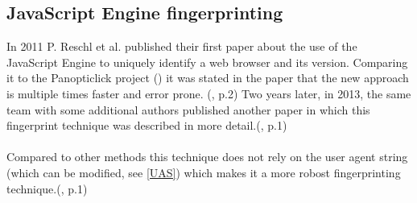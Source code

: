 \subsection{JavaScript Engine fingerprinting}
In 2011 P. Reschl et al. published their first paper about the use of the JavaScript Engine to uniquely identify a web browser and its version. Comparing it to the Panopticlick project (\textcite{eckersley10}) it was stated in the paper that the new approach is multiple times faster and error prone. (\textcite{reschl11}, p.2) Two years later, in 2013, the same team with some additional authors published another paper in which this fingerprint technique was described in more detail.(\textcite{mulazzani13}, p.1) \\\\
Compared to other methods this technique does not rely on the user agent string (which can be modified, see \autoref{UAS}) which makes it a more robost fingerprinting technique.(\textcite{mulazzani13}, p.1)


